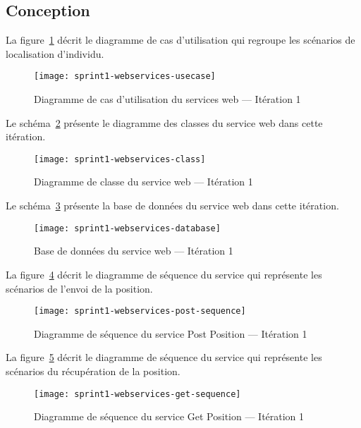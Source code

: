 \subsection{Conception}

La figure~\ref{fig:sprint1-webservices-usecase} décrit le diagramme
de cas d'utilisation qui regroupe les scénarios de localisation d'individu.

\begin{figure}[H]
    \centering
    \texttt{[image: sprint1-webservices-usecase]}
    \caption{Diagramme de cas d'utilisation du services web --- Itération 1}
\label{fig:sprint1-webservices-usecase}
\end{figure}

Le schéma~\ref{fig:sprint1-webservices-class} présente le diagramme des classes
du service web dans cette itération.

\begin{figure}[H]
    \centering
    \texttt{[image: sprint1-webservices-class]}
    \caption{Diagramme de classe du service web --- Itération 1}
\label{fig:sprint1-webservices-class}
\end{figure}

Le schéma~\ref{fig:sprint1-webservices-database} présente la base de données
du service web dans cette itération.

\begin{figure}[H]
    \centering
    \texttt{[image: sprint1-webservices-database]}
    \caption{Base de données du service web --- Itération 1}
\label{fig:sprint1-webservices-database}
\end{figure}

La figure~\ref{fig:sprint1-webservices-post-sequence} décrit le diagramme de
séquence du service  qui représente les scénarios de
l'envoi de la position.

\begin{figure}[H]
    \centering
    \texttt{[image: sprint1-webservices-post-sequence]}
    \caption{Diagramme de séquence du service Post Position --- Itération 1}
\label{fig:sprint1-webservices-post-sequence}
\end{figure}

La figure~\ref{fig:sprint1-webservices-get-sequence} décrit le diagramme de
séquence du service  qui représente les scénarios du
récupération de la position.

\begin{figure}[H]
    \centering
    \texttt{[image: sprint1-webservices-get-sequence]}
    \caption{Diagramme de séquence du service Get Position --- Itération 1}
\label{fig:sprint1-webservices-get-sequence}
\end{figure}

